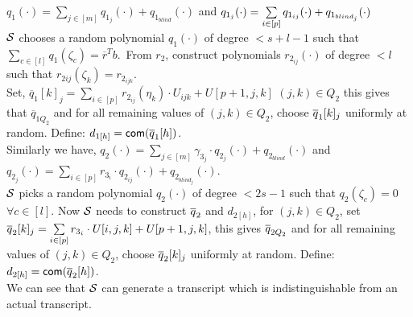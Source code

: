 $q_1(\cdot)=\sum\limits_{j\in[m]} q_{1_j}(\cdot)+ q_{1_{blind}}(\cdot)$ and $q_{1_j}(\cdot)=\sum\limits_{i\in[p]}q_{1_{ij}}(\cdot)+\q1bj(\cdot)$\\
${\cal S}$ chooses a random polynomial $q_1(\cdot)$ of degree $<s+l-1$ such that $\sum\limits_{c\in[l]}q_1(\zeta_c)=\overline{r}^Tb$.\
From $r_2$, construct polynomials $r_{2_{ij}}(\cdot)$ of degree $<l$ such that $r_{2{ij}}(\zeta_k)=r_{2_{ijk}}$.\\
Set, $\overline{q}_1[k]_j=\sum\limits_{i\in[p]} r_{2_{ij}}(\eta_k)\cdot U_{ijk} + U[p+1,j,k]$ $(j,k)\in Q_2$ this gives that $\overline{q}_{1Q_2}$ and for all remaining values of $(j,k)\in Q_2$, choose $\overline{q}_1[k]_j$ uniformly at random. Define: $d_{1[h]}=\mathsf{com}(\overline{q}_{1}[h])$.\\
Similarly we have, $q_2(\cdot)=\sum\limits_{j\in[m]}\gamma_{3_j}\cdot q_{2_j}(\cdot) + q_{2_{blind}}(\cdot)$ and $q_{2_j}(\cdot) = \sum\limits_{i\in [p]} r_{3_i}\cdot q_{2_{ij}}(\cdot) + q_{2_{blind_j}}(\cdot)$.\\
${\cal S}$ picks a random polynomial $q_2(\cdot)$ of degree $<2s-1$ such that $q_2(\zeta_c)=0$ $\forall c\in [l]$. Now ${\cal S}$ needs to construct $\overline{q}_2$ and $d_{2[h]}$,
for $(j,k)\in Q_2$, set $\overline{q}_2[k]_j=\sum\limits_{i\in[p]} r_{3_i}\cdot U[i,j,k] + U[p+1,j,k]$, this gives $\overline{q}_{2Q_2}$ and for all remaining values of $(j,k)\in Q_2$, choose $\overline{q}_2[k]_j$ uniformly at random. Define: $d_{2[h]}=\mathsf{com}(\overline{q}_2[h])$.\\
We can see that ${\cal S}$ can generate a transcript which is indistinguishable from an actual transcript.